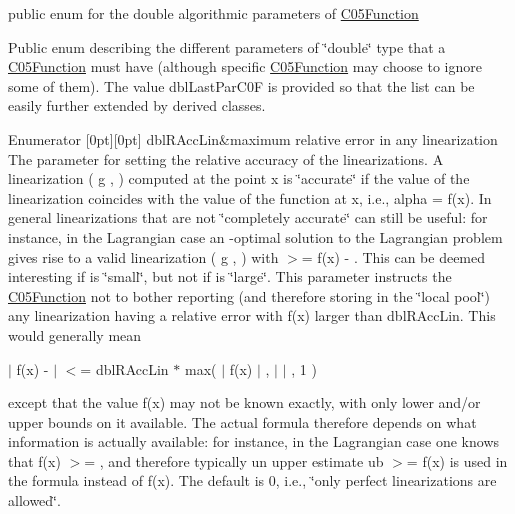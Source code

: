 public enum for the double algorithmic parameters of \mbox{\hyperlink{class_s_m_spp__di__unipi__it_1_1_c05_function}{C05\+Function}} 

Public enum describing the different parameters of \char`\"{}double\char`\"{} type that a \mbox{\hyperlink{class_s_m_spp__di__unipi__it_1_1_c05_function}{C05\+Function}} must have (although specific \mbox{\hyperlink{class_s_m_spp__di__unipi__it_1_1_c05_function}{C05\+Function}} may choose to ignore some of them). The value dbl\+Last\+Par\+C0F is provided so that the list can be easily further extended by derived classes. \begin{DoxyEnumFields}{Enumerator}
[0pt][0pt]{}\mbox{\label{class_s_m_spp__di__unipi__it_1_1_c05_function_ad345d4c374ce38e8a5fe153e07da4fa5a6ba790b139c75ced8d60c2385104728d}} 
dbl\+R\+Acc\+Lin&maximum relative error in any linearization The parameter for setting the relative accuracy of the linearizations. A linearization ( g ,  ) computed at the point x is \char`\"{}accurate\char`\"{} if the value of the linearization coincides with the value of the function at x, i.\+e., alpha = f(x). In general linearizations that are not \char`\"{}completely accurate\char`\"{} can still be useful\+: for instance, in the Lagrangian case an -\/optimal solution to the Lagrangian problem gives rise to a valid linearization ( g ,  ) with  $>$= f(x) -\/ . This can be deemed interesting if  is \char`\"{}small\char`\"{}, but not if  is \char`\"{}large\char`\"{}. This parameter instructs the \mbox{\hyperlink{class_s_m_spp__di__unipi__it_1_1_c05_function}{C05\+Function}} not to bother reporting (and therefore storing in the \char`\"{}local pool\char`\"{}) any linearization having a relative error with f(x) larger than dbl\+R\+Acc\+Lin. This would generally mean

$\vert$ f(x) -\/  $\vert$ $<$= dbl\+R\+Acc\+Lin $\ast$ max( $\vert$ f(x) $\vert$ , $\vert$  $\vert$ , 1 )

except that the value f(x) may not be known exactly, with only lower and/or upper bounds on it available. The actual formula therefore depends on what information is actually available\+: for instance, in the Lagrangian case one knows that f(x) $>$= , and therefore typically un upper estimate ub $>$= f(x) is used in the formula instead of f(x). The default is 0, i.\+e., \char`\"{}only perfect linearizations are allowed\char`\"{}. \\
\hline


\end{DoxyEnumFields}
